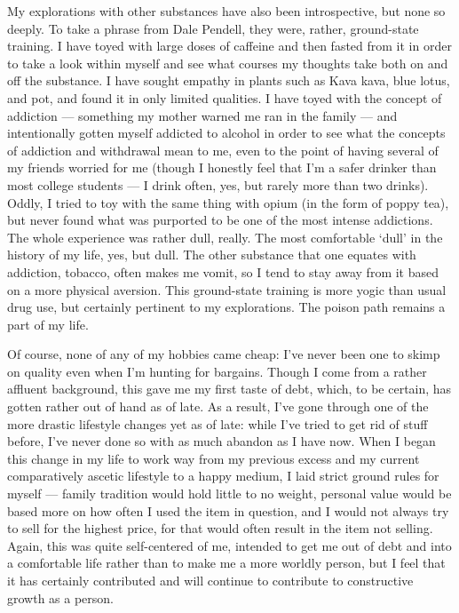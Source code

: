 \documentclass{book}
\begin{document}
My explorations with other substances have also been introspective, but none so deeply.  To take a phrase from Dale Pendell, they were, rather, ground-state training.  I have toyed with large doses of caffeine and then fasted from it in order to take a look within myself and see what courses my thoughts take both on and off the substance.  I have sought empathy in plants such as Kava kava, blue lotus, and pot, and found it in only limited qualities.  I have toyed with the concept of addiction --- something my mother warned me ran in the family --- and intentionally gotten myself addicted to alcohol in order to see what the concepts of addiction and withdrawal mean to me, even to the point of having several of my friends worried for me (though I honestly feel that I'm a safer drinker than most college students --- I drink often, yes, but rarely more than two drinks).  Oddly, I tried to toy with the same thing with opium (in the form of poppy tea), but never found what was purported to be one of the most intense addictions.  The whole experience was rather dull, really.  The most comfortable `dull' in the history of my life, yes, but dull.  The other substance that one equates with addiction, tobacco, often makes me vomit, so I tend to stay away from it based on a more physical aversion.  This ground-state training is more yogic than usual drug use, but certainly pertinent to my explorations.  The poison path remains a part of my life.

Of course, none of any of my hobbies came cheap: I've never been one to skimp on quality even when I'm hunting for bargains.  Though I come from a rather affluent background, this gave me my first taste of debt, which, to be certain, has gotten rather out of hand as of late.  As a result, I've gone through one of the more drastic lifestyle changes yet as of late: while I've tried to get rid of stuff before, I've never done so with as much abandon as I have now.  When I began this change in my life to work way from my previous excess and my current comparatively ascetic lifestyle to a happy medium, I laid strict ground rules for myself --- family tradition would hold little to no weight, personal value would be based more on how often I used the item in question, and I would not always try to sell for the highest price, for that would often result in the item not selling.  Again, this was quite self-centered of me, intended to get me out of debt and into a comfortable life rather than to make me a more worldly person, but I feel that it has certainly contributed and will continue to contribute to constructive growth as a person.
\end{document}

